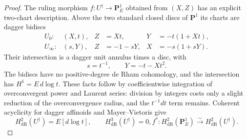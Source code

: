 \documentclass[11pt,a4paper]{article}
\theoremstyle{remark}
\newcommand{\PP}{\mathbf P}
\begin{document}
\begin{proof}
The ruling morphism $f:U^\dagger\to\PP^1_E$ obtained from $(X,Z)$ has an explicit two-chart description. Above the two standard closed discs of $\PP^1$ its charts are dagger bidiscs
\begin{align*}
U_0: &(X,t),&Z&=Xt,&Y&=-t(1+Xt),\\
U_\infty: &(s,Y),&Z&=-1-sY,&X&=-s(1+sY).
\end{align*}
Their intersection is a dagger unit annulus times a disc, with
\[
s=t^{-1},\qquad Y=-t-Xt^2.
\]
The bidiscs have no positive-degree de Rham cohomology, and the intersection has $H^1=E\,d\log t$. These facts follow by coefficientwise integration of overconvergent power and Laurent series: division by integers costs only a slight reduction of the overconvergence radius, and the $t^{-1}dt$ term remains. Coherent acyclicity for dagger affinoids \cite[Proposition~3.1]{GrosseKlonne} and Mayer--Vietoris give
\[
H^2_{\mathrm{dR}}(U^\dagger)=E[d\log t],\qquad H^3_{\mathrm{dR}}(U^\dagger)=0,
f^*:H^2_{\mathrm{dR}}(\PP^1_E)\xrightarrow{\sim}H^2_{\mathrm{dR}}(U^\dagger).
\]


\end{proof}
\end{document}

